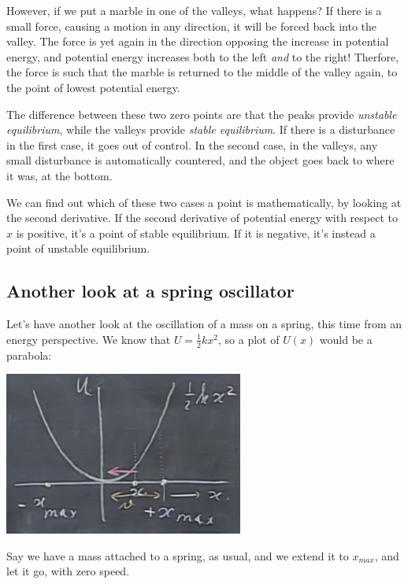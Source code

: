 \documentclass[12pt,a4paper]{report}
\begin{document}
However, if we put a marble in one of the valleys, what happens? If there is a small force, causing a motion in any direction, it will be forced back into the valley. The force is yet again in the direction opposing the increase in potential energy, and potential energy increases both to the left \emph{and} to the right! Therfore, the force is such that the marble is returned to the middle of the valley again, to the point of lowest potential energy.

The difference between these two zero points are that the peaks provide \emph{unstable equilibrium}, while the valleys provide \emph{stable equilibrium}. If there is a disturbance in the first case, it goes out of control. In the second case, in the valleys, any small disturbance is automatically countered, and the object goes back to where it was, at the bottom.

We can find out which of these two cases a point is mathematically, by looking at the second derivative. If the second derivative of potential energy with respect to $x$ is positive, it's a point of stable equilibrium. If it is negative, it's instead a point of unstable equilibrium.

\subsection{Another look at a spring oscillator}

Let's have another look at the oscillation of a mass on a spring, this time from an energy perspective. We know that $\displaystyle U = \frac{1}{2} k x^2$, so a plot of $U(x)$ would be a parabola:

\begin{center}
\includegraphics[scale=0.8]{Graphics/lec13_spring_pe}
\end{center}

Say we have a mass attached to a spring, as usual, and we extend it to $x_{max}$, and let it go, with zero speed.
\end{document}
